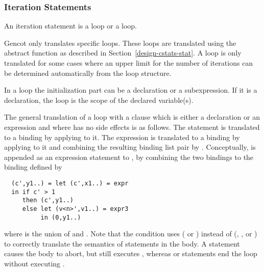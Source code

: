 \subsubsection{Iteration Statements}

An iteration statement is a  loop or a  loop.

Gencot only translates specific  loops. These loops are translated using the abstract function  as described
in Section~\ref{design-cstats-stat}. A  loop is only translated for some cases where an upper limit for the number of 
iterations can be determined automatically from the loop structure.

In a  loop the initialization part can be a declaration or a subexpression. If it is a declaration, the  loop
is the scope of the declared variable(s).

The general translation of a loop  with a clause  which is either a declaration or an expression
and where  has no side effects
is as follows. The statement  is translated to a binding  by applying  to it. The expression
 is translated to a binding  by applying  to it and combining the resulting binding
list pair by . Conceptually,  is appended as an expression statement to , by combining the two bindings
to the binding  defined by
\begin{verbatim}
  (c',y1..) = let (c',x1..) = expr
  in if c' > 1
     then (c',y1..)
     else let (v<n>',v1..) = expr3
          in (0,y1..)
\end{verbatim}
where  is the union of  and . Note that the condition uses  ( or ) 
instead of  (, , or ) to correctly translate the semantics of  
statements in the body. A  statement causes the body to abort, but still executes , whereas  
or  statements end the loop without executing .

